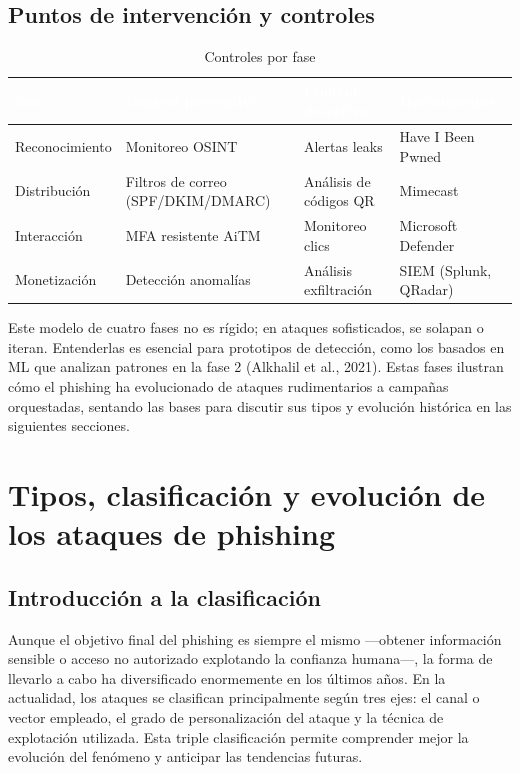 \documentclass[11pt,a4paper,oneside]{report}
\begin{document}
\subsection{Puntos de intervención y controles}

\begingroup
\begin{table}[H]
  \centering
  \small
  \caption{Controles por fase}
  \label{tab:2-3}
  \begin{tabularx}{\textwidth}{|X|X|X|X|}
    \hline
    \rowcolor{uemcgreen}
    \textcolor{white}{\textbf{Fase}} & \textcolor{white}{\textbf{Control preventivo}} & \textcolor{white}{\textbf{Control detectivo}} & \textcolor{white}{\textbf{Herramientas}} \\
    \hline
    Reconocimiento & Monitoreo OSINT & Alertas leaks & Have I Been Pwned \\
    \hline
    \rowcolor{tablelight}
    Distribución & Filtros de correo (SPF/DKIM/DMARC) & Análisis de códigos QR & Mimecast \\
    \hline
    Interacción & MFA resistente AiTM & Monitoreo clics & Microsoft Defender \\
    \hline
    \rowcolor{tablelight}
    Monetización & Detección anomalías & Análisis exfiltración & SIEM (Splunk, QRadar) \\
    \hline
  \end{tabularx}
\end{table}
\endgroup

Este modelo de cuatro fases no es rígido; en ataques sofisticados, se solapan o iteran. Entenderlas es esencial para prototipos de detección, como los basados en ML que analizan patrones en la fase 2 (Alkhalil et al., 2021). Estas fases ilustran cómo el phishing ha evolucionado de ataques rudimentarios a campañas orquestadas, sentando las bases para discutir sus tipos y evolución histórica en las siguientes secciones.

\section{Tipos, clasificación y evolución de los ataques de phishing}

\subsection{Introducción a la clasificación}

Aunque el objetivo final del phishing es siempre el mismo ---obtener información sensible o acceso no autorizado explotando la confianza humana---, la forma de llevarlo a cabo ha diversificado enormemente en los últimos años. En la actualidad, los ataques se clasifican principalmente según tres ejes: el canal o vector empleado, el grado de personalización del ataque y la técnica de explotación utilizada. Esta triple clasificación permite comprender mejor la evolución del fenómeno y anticipar las tendencias futuras.
\end{document}
